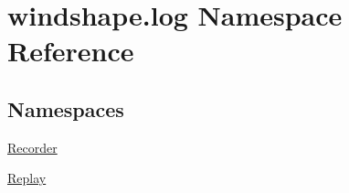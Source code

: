 \hypertarget{namespacewindshape_1_1log}{}\section{windshape.\+log Namespace Reference}
\label{namespacewindshape_1_1log}
\subsection*{Namespaces}
\begin{DoxyCompactItemize}
\item 
 \mbox{\hyperlink{namespacewindshape_1_1log_1_1_recorder}{Recorder}}
\item 
 \mbox{\hyperlink{namespacewindshape_1_1log_1_1_replay}{Replay}}
\end{DoxyCompactItemize}
